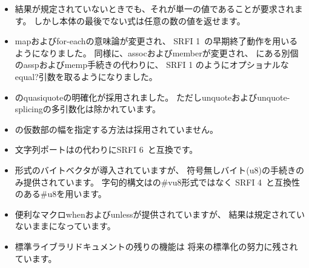 \begin{itemize}
\item 結果が規定されていないときでも、それが単一の値であることが要求されます。
しかし本体の最後でない式は任意の数の値を返せます。

\item {\cf map}および{\cf for-each}の意味論が変更され、
SRFI 1~\cite{srfi1}の早期終了動作を用いるようになりました。
同様に、{\cf assoc}および{\cf member}が変更され、
\rsixrs{}にある別個の{\cf assp}および{\cf memp}手続きの代わりに、
SRFI 1 のようにオプショナルな{\cf equal?}引数を取るようになりました。

\item \rsixrs{}の{\cf quasiquote}の明確化が採用されました。
ただし{\cf unquote}および{\cf unquote-splicing}の多引数化は除かれています。

\item \rsixrs{}の仮数部の幅を指定する方法は採用されていません。

\item 文字列ポートは\rsixrs{}の代わりにSRFI 6~\cite{srfi6}と互換です。

\item \rsixrs{}形式のバイトベクタが導入されていますが、
符号無しバイト({\cf u8})の手続きのみ提供されています。
字句的構文は\rsixrs{}の{\cf \#vu8}形式ではなく
SRFI 4~\cite{srfi4}と互換性のある{\cf \#u8}を用います。

\item 便利なマクロ{\cf when}および{\cf unless}が提供されていますが、
結果は規定されていないままになっています。

\item 標準ライブラリドキュメントの残りの機能は
将来の標準化の努力に残されています。

\end{itemize}

